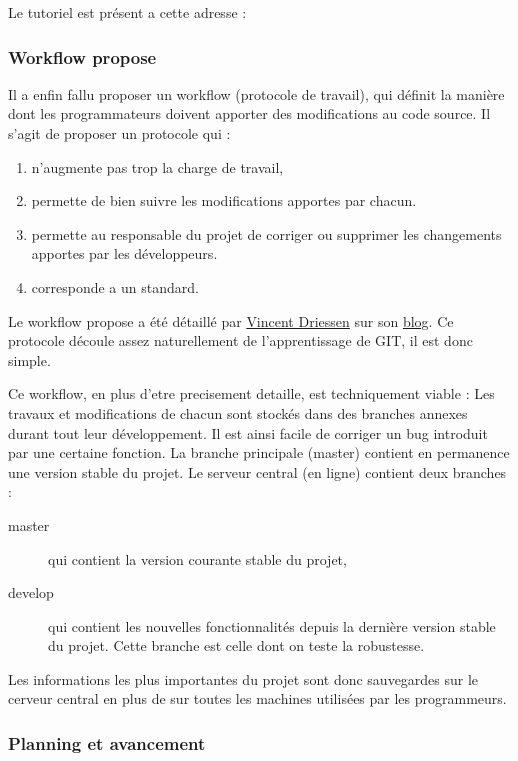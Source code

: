 Le tutoriel est présent a cette adresse : \\
\url{}

\subsubsection{Workflow propose}
Il a enfin fallu proposer un workflow (protocole de travail), qui définit la manière dont les programmateurs doivent apporter des modifications au code source. Il s'agit de proposer un protocole qui :
\begin{enumerate}
  \item n'augmente pas trop la charge de travail,
  \item permette de bien suivre les modifications apportes par chacun. 
  \item permette au responsable du projet de corriger ou supprimer les changements apportes par les développeurs.
  \item corresponde a un standard.
\end{enumerate}
Le workflow propose a été détaillé par \href{http://nvie.com/about }{Vincent Driessen} sur son \href{http://nvie.com/git-model}{blog}. Ce protocole découle assez naturellement de l'apprentissage de GIT, il est donc simple.

Ce workflow, en plus d'etre precisement detaille, est techniquement viable :
Les travaux et modifications de chacun sont stockés dans des branches annexes durant tout leur développement. Il est ainsi facile de corriger un bug introduit par une certaine fonction. La branche principale (master) contient en permanence une version stable du projet.
Le serveur central (en ligne) contient deux branches :
\begin{description}
  \item [master] qui contient la version courante stable du projet,
  \item [develop] qui contient les nouvelles fonctionnalités depuis la dernière version stable du projet. Cette branche est celle dont on teste la robustesse.
\end{description}
Les informations les plus importantes du projet sont donc sauvegardes sur le cerveur central en plus de sur toutes les machines utilisées par les programmeurs. 


\subsubsection{Planning et avancement}













